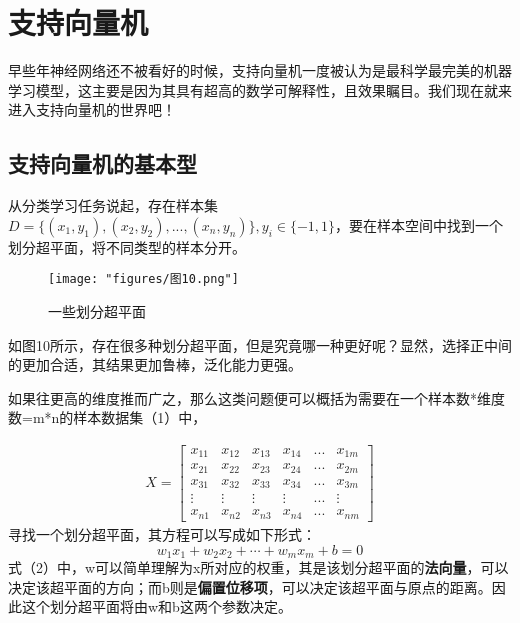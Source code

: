 \section{支持向量机}
早些年神经网络还不被看好的时候，支持向量机一度被认为是最科学最完美的机器学习模型，这主要是因为其具有超高的数学可解释性，且效果瞩目。我们现在就来进入支持向量机的世界吧！
\subsection{支持向量机的基本型}
从分类学习任务说起，存在样本集$D=\{(x_1,y_1),(x_2,y_2),...,(x_n,y_n)\},y_i\in\{-1,1\}$，要在样本空间中找到一个划分超平面，将不同类型的样本分开。
\begin{figure}[ht] %
	\centering
	\texttt{[image: "figures/图10.png"]} %
	\caption{一些划分超平面} %
	\label{fig:example} %
\end{figure}

如图10所示，存在很多种划分超平面，但是究竟哪一种更好呢？显然，选择正中间的更加合适，其结果更加鲁棒，泛化能力更强。

如果往更高的维度推而广之，那么这类问题便可以概括为需要在一个样本数*维度数=m*n的样本数据集（1）中，
\setcounter{equation}{0} %

\begin{equation}\begin{gathered}X=\begin{bmatrix}x_{11}&x_{12}&x_{13}&x_{14}&...&x_{1m}\\x_{21}&x_{22}&x_{23}&x_{24}&...&x_{2m}\\x_{31}&x_{32}&x_{33}&x_{34}&...&x_{3m}\\\vdots&\vdots&\vdots&\vdots&...&\vdots\\x_{n1}&x_{n2}&x_{n3}&x_{n4}&...&x_{nm}\end{bmatrix}\end{gathered}\end{equation}
寻找一个划分超平面，其方程可以写成如下形式：
\begin{equation}w_1x_1+w_2x_2+\cdots+w_mx_m+b=0\end{equation}
式（2）中，w可以简单理解为x所对应的权重，其是该划分超平面的\textbf{法向量}，可以决定该超平面的方向；而b则是\textbf{偏置位移项}，可以决定该超平面与原点的距离。因此这个划分超平面将由w和b这两个参数决定。


